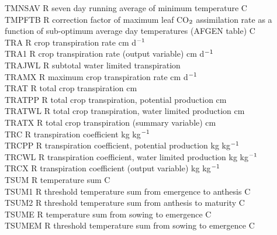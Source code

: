 \documentclass[11pt]{article}
\begin{document}
\begin{tabbing}
TMNSAV\> \> R\> seven day running average of minimum temperature\> \> \> \> \> \> \> \degrees C\\
TMPFTB\> \> R\> correction factor of maximum leaf CO$_{{\rm 2}}$ assimilation rate as a\\
\>\> \> function of sub-optimum average day temperatures (AFGEN table)\> \> \> \> \> \> \> \degrees C\\
TRA\> \> R\> crop transpiration rate\> \> \> \> \> \> \> cm d$^{{\rm -1}}$\\
TRA1\> \> R\> crop transpiration rate (output variable)\> \> \> \> \> \> \> cm d$^{{\rm -1}}$\\
TRAJWL\> \> R\> subtotal water limited transpiration\\
TRAMX\> \> R\> maximum crop transpiration rate\> \> \> \> \> \> \> cm d$^{{\rm -1}}$\\
TRAT\> \> R\> total crop transpiration\> \> \> \> \> \> \> cm\\
TRATPP\> \> R\> total crop transpiration, potential production\> \> \> \> \> \> \> cm\\
TRATWL\> \> R\> total crop transpiration, water limited production\> \> \> \> \> \> \> cm\\
TRATX\> \> R\> total crop transpiration (summary variable)\> \> \> \> \> \> \> cm\\
TRC    \> \> R   \> transpiration coefficient  \> \> \> \> \> \> \> kg kg$^{{\rm -1}}$\\
TRCPP\> \> R   \> transpiration coefficient, potential production  \> \> \> \> \> \> \> kg kg$^{{\rm -1}}$\\
TRCWL\> \> R   \> transpiration coefficient, water limited production  \> \> \> \> \> \> \> kg kg$^{{\rm -1}}$\\
TRCX\> \> R   \> transpiration coefficient (output variable)\> \> \> \> \> \> \> kg kg$^{{\rm -1}}$\\
TSUM\> \> R\> temperature sum\> \> \> \> \> \> \> \degrees C\\
TSUM1\> \> R\> threshold temperature sum from emergence to anthesis\> \> \> \> \> \> \> \degrees C\\
TSUM2\> \> R\> threshold temperature sum from anthesis to maturity\> \> \> \> \> \> \> \degrees C\\
TSUME\> \> R\> temperature sum from sowing to emergence\> \> \> \> \> \> \> \degrees C\\
TSUMEM\> \> R\> threshold temperature sum from sowing to emergence\> \> \> \> \> \> \> \degrees C\\

\end{tabbing}
\end{document}
